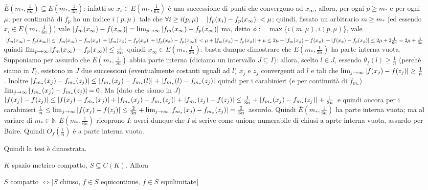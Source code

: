 $\overline{E}(m_*,\frac{1}{6n})\subseteq E(m_*,\frac{1}{3n})$: infatti se $x_i\in E(m_*,\frac{1}{6n})$ è una successione di punti che convergono ad $x_\infty$, allora, per ogni $p\ge m_*$ e per ogni $\mu$, per continuità di $f_p$ ho un indice $i(p,\mu)$ tale che $\forall i\ge i(p,\mu) \quad \left|f_p(x_i)-f_p(x_\infty)\right|<\mu$; quindi, fissato un arbitrario $m\ge m_*$ (ed essendo $x_i\in E(m_*,\frac{1}{6n})$) vale $\left|f_m(x_\infty)-f(x_\infty)\right|=\lim_{p\rightarrow\infty}\left|f_m(x_\infty)-f_p(x_\infty)\right|$ ma, detto $\phi:=\max\{i(m,\mu),i(p,\mu)\}$, vale $\left|f_m(x_\infty)-f_p(x_\infty)\right|\le\left|f_m(x_\infty)-f_m(x_\phi)\right|+\left|f_m(x_\phi)-f_p(x_\phi)\right|+\left|f_p(x_\phi)-f_p(x_\infty)\right|<\mu+\left|f_m(x_\phi)-f_p(x_\phi)\right|+\mu\le2\mu+\left|f_m(x_\phi)-f(x_\phi)\right|+\left|f(x_\phi)-f_p(x_\phi)\right|\le2\mu+2\frac{1}{6n}=2\mu+\frac{1}{3n}$ quindi $\lim_{p\rightarrow\infty}\left|f_m(x_\infty)-f_p(x_\infty)\right|\le\frac{1}{3n}$ quindi $x_\infty\in E(m_*,\frac{1}{3n})$: basta dunque dimostrare che $E(m_*,\frac{1}{3n})$ ha parte interna vuota. Supponiamo per assurdo che $E(m_*,\frac{1}{3n})$ abbia parte interna (diciamo un intervallo $J\subseteq I$): allora, scelto $l\in J$, essendo $\theta_f(l)\ge\frac{1}{n}$ (perchè siamo in $I$), esistono in $J$ due successioni (eventualmente costanti uguali ad $l$) $x_j$ e $z_j$ convergenti ad $l$ e tali che $\lim_{j\rightarrow\infty}\left|f(x_j)-f(z_j)\right|\ge\frac{1}{n}$. Inoltre $\left|f_{m_*}(x_j)-f_{m_*}(z_j)\right|\le\left|f_{m_*}(x_j)-f_{m_*}(l)\right|+\left|f_{m_*}(l)-f_{m_*}(z_j)\right|$ quindi per i carabinieri (e per continuità di $f_{m_*}$) $\lim_{j\rightarrow\infty}\left|f_{m_*}(x_j)-f_{m_*}(z_j)\right|=0$. Ma (dato che siamo in $J$) $\left|f(x_j)-f(z_j)\right|\le\left|f(x_j)-f_{m_*}(x_j)\right|+\left|f_{m_*}(x_j)-f_{m_*}(z_j)\right|+\left|f_{m_*}(z_j)-f(z_j)\right|\le\frac{1}{3n}+\left|f_{m_*}(x_j)-f_{m_*}(z_j)\right|+\frac{1}{3n}$ e quindi ancora per i carabinieri $\frac{1}{n}\le\lim_{j\rightarrow\infty}\left|f(x_j)-f(z_j)\right|\le\frac{2}{3n}+\lim_{j\rightarrow\infty}\left|f_{m_*}(x_j)-f_{m_*}(z_j)\right|=\frac{2}{3n}$ assurdo.
Quindi $\overline{E}(m_*,\frac{1}{6n})$ ha parte interna vuota; ma al variare di $m_*\in\mathbb N$ $\overline{E}(m_*,\frac{1}{6n})$ ricoprono $I$: avrei dunque che $I$ si scrive come unione numerabile di chiusi a aprte interna vuota, assurdo per Baire.
Quindi $O_f(\frac{1}{n})$ è a parte interna vuota.

Quindi la tesi è dimostrata.

 $K$ spazio metrico compatto, $S\subseteq C(K)$. Allora
\begin{center}
$S$ compatto $\Leftrightarrow[S$ chiuso, $f\in S$ equicontinue, $f\in S$ equilimitate$]$
\end{center}

